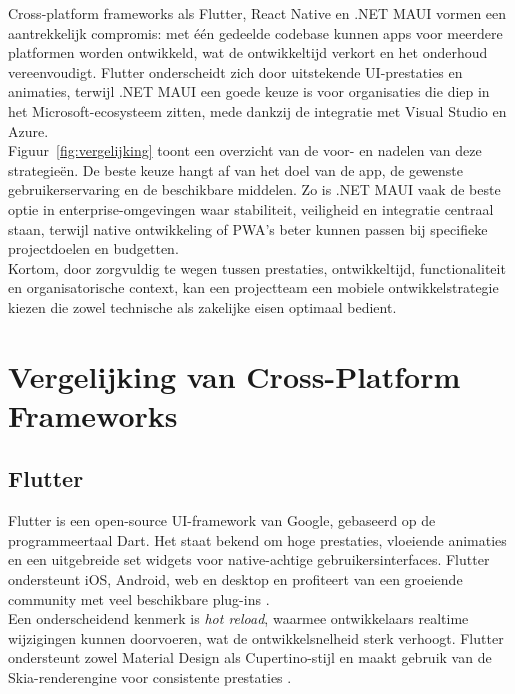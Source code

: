 Cross-platform frameworks als Flutter, React Native en .NET MAUI vormen een aantrekkelijk compromis: met één gedeelde codebase kunnen apps voor meerdere platformen worden ontwikkeld, wat de ontwikkeltijd verkort en het onderhoud vereenvoudigt. Flutter onderscheidt zich door uitstekende UI-prestaties en animaties, terwijl .NET MAUI een goede keuze is voor organisaties die diep in het Microsoft-ecosysteem zitten, mede dankzij de integratie met Visual Studio en Azure.\\

Figuur~\ref{fig:vergelijking} toont een overzicht van de voor- en nadelen van deze strategieën. De beste keuze hangt af van het doel van de app, de gewenste gebruikerservaring en de beschikbare middelen. Zo is .NET MAUI vaak de beste optie in enterprise-omgevingen waar stabiliteit, veiligheid en integratie centraal staan, terwijl native ontwikkeling of PWA’s beter kunnen passen bij specifieke projectdoelen en budgetten.\\

Kortom, door zorgvuldig te wegen tussen prestaties, ontwikkeltijd, functionaliteit en organisatorische context, kan een projectteam een mobiele ontwikkelstrategie kiezen die zowel technische als zakelijke eisen optimaal bedient.

\section{Vergelijking van Cross-Platform Frameworks}

\subsection{Flutter}
Flutter is een open-source UI-framework van Google, gebaseerd op de programmeertaal Dart. Het staat bekend om hoge prestaties, vloeiende animaties en een uitgebreide set widgets voor native-achtige gebruikersinterfaces. Flutter ondersteunt iOS, Android, web en desktop en profiteert van een groeiende community met veel beschikbare plug-ins \autocite{Gajjam2025}.\\

Een onderscheidend kenmerk is \emph{hot reload}, waarmee ontwikkelaars realtime wijzigingen kunnen doorvoeren, wat de ontwikkelsnelheid sterk verhoogt. Flutter ondersteunt zowel Material Design als Cupertino-stijl en maakt gebruik van de Skia-renderengine voor consistente prestaties \autocite{Rodriguez2025}.\\

